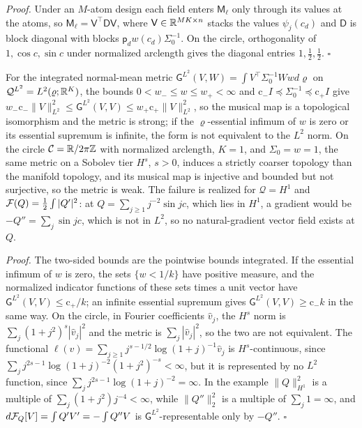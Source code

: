 \noindent\emph{Proof.}
Under an \(M\)-atom design each field enters \(\mathsf M_\ell\) only through its
values at the atoms, so \(\mathsf M_\ell=\mathsf V^\top\mathsf D\mathsf V\), where
\(\mathsf V\in\mathbb R^{MK\times n}\) stacks the values \(\psi_j(c_d)\) and
\(\mathsf D\) is block diagonal with blocks \(\mathsf p_dw(c_d)\Sigma_0^{-1}\). On
the circle, orthogonality of
\(1,\cos c,\sin c\) under normalized arclength gives the diagonal entries
\(1,\tfrac12,\tfrac12\). \(\square\)

For the integrated normal-mean metric
\(\mathsf G^{L^2}(V,W)=\int V^\top\Sigma_0^{-1}Ww d\varrho\) on
\(\mathcal Q^{L^2}=L^2(\varrho;\mathbb R^K)\), the bounds
\(0<w_-\leq w\leq w_+<\infty\) and
\(\mathrm c_-I\preceq\Sigma_0^{-1}\preceq\mathrm c_+I\) give
\(w_-\mathrm c_-\|V\|^2_{L^2}\leq\mathsf G^{L^2}(V,V)\leq w_+\mathrm c_+\|V\|^2_{L^2}\),
so the musical map is a topological isomorphism and the metric is strong; if the
\(\varrho\)-essential infimum of \(w\) is zero or its essential supremum is
infinite, the form is not equivalent to the \(L^2\) norm. On the circle
\(\mathcal C=\mathbb R/2\pi\mathbb Z\) with normalized arclength, \(K=1\), and
\(\Sigma_0=w=1\), the same metric on a Sobolev tier \(H^s\), \(s>0\), induces a
strictly coarser topology than the manifold topology, and its musical map is
injective and bounded but not surjective, so the metric is weak. The failure is
realized for \(\mathcal Q=H^1\) and \(\mathcal F(Q)=\tfrac12\int|Q'|^2\): at
\(Q=\sum_{j\geq1}j^{-2}\sin jc\), which lies in \(H^1\), a gradient would be
\(-Q''=\sum_j\sin jc\), which is not in \(L^2\), so no natural-gradient vector
field exists at \(Q\). 

\noindent\emph{Proof.}
The two-sided bounds are the pointwise bounds integrated. If the essential
infimum of \(w\) is zero, the sets \(\{w<1/k\}\) have positive measure, and the
normalized indicator functions of these sets times a unit vector have
\(\mathsf G^{L^2}(V,V)\leq\mathrm c_+/k\); an infinite essential supremum gives
\(\mathsf G^{L^2}(V,V)\geq\mathrm c_-k\) in the same way. On the circle, in
Fourier coefficients \(\hat v_j\), the \(H^s\) norm is
\(\sum_j(1+j^2)^s|\hat v_j|^2\) and the metric is \(\sum_j|\hat v_j|^2\), so the two
are not equivalent. The functional
\(\ell(v)=\sum_{j\geq1}j^{s-1/2}\log(1+j)^{-1}\hat v_j\) is \(H^s\)-continuous,
since \(\sum_jj^{2s-1}\log(1+j)^{-2}(1+j^2)^{-s}<\infty\), but it is represented
by no \(L^2\) function, since \(\sum_jj^{2s-1}\log(1+j)^{-2}=\infty\). In the
example \(\|Q\|_{H^1}^2\) is a multiple of \(\sum_j(1+j^2)j^{-4}<\infty\), while
\(\|Q''\|_2^2\) is a multiple of \(\sum_j1=\infty\), and
\(d\mathcal F_Q[V]=\int Q'V'=-\int Q''V\) is \(\mathsf G^{L^2}\)-representable only
by \(-Q''\). \(\square\)

